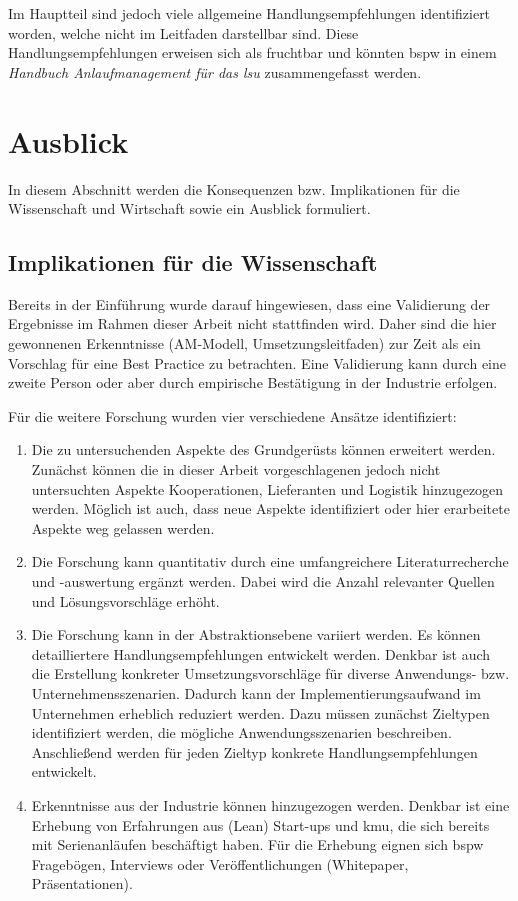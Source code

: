Im Hauptteil sind jedoch viele allgemeine Handlungsempfehlungen identifiziert worden, welche nicht im Leitfaden darstellbar sind. Diese Handlungsempfehlungen erweisen sich als fruchtbar und könnten \gls{bspw} in einem \textit{Handbuch Anlaufmanagement für das \gls{lsu}} zusammengefasst werden. 

\section{Ausblick}

In diesem Abschnitt werden die Konsequenzen bzw. Implikationen für die Wissenschaft und Wirtschaft sowie ein Ausblick formuliert. 

\subsection*{Implikationen für die Wissenschaft}
Bereits in der Einführung wurde darauf hingewiesen, dass eine Validierung der Ergebnisse im Rahmen dieser Arbeit nicht stattfinden wird. Daher sind die hier gewonnenen Erkenntnisse (AM-Modell, Umsetzungsleitfaden) zur Zeit als ein Vorschlag für eine Best Practice zu betrachten. Eine Validierung kann durch eine zweite Person %
oder aber durch empirische Bestätigung in der Industrie erfolgen. 

Für die weitere Forschung wurden vier verschiedene Ansätze identifiziert: 

\begin{enumerate}
 \item Die zu untersuchenden Aspekte des Grundgerüsts können erweitert werden. Zunächst können die in dieser Arbeit vorgeschlagenen jedoch nicht untersuchten Aspekte Kooperationen, Lieferanten und Logistik 
 hinzugezogen werden. Möglich ist auch, dass neue Aspekte identifiziert oder hier erarbeitete Aspekte weg gelassen werden.  
\item Die Forschung kann quantitativ durch eine umfangreichere Literaturrecherche und -aus\-wer\-tung ergänzt werden. Dabei wird die Anzahl relevanter Quellen und Lösungsvorschläge erhöht. 
\item Die Forschung kann in der Abstraktionsebene variiert werden. Es können detailliertere Handlungsempfehlungen entwickelt werden. Denkbar ist auch die Erstellung konkreter Umsetzungsvorschläge für diverse Anwendungs- bzw. Unternehmensszenarien. Dadurch kann der Implementierungsaufwand im Unternehmen erheblich reduziert werden. Dazu müssen zunächst Zieltypen identifiziert werden, die mögliche Anwendungsszenarien beschreiben. Anschließend werden für jeden Zieltyp konkrete Handlungsempfehlungen entwickelt. 
\item Erkenntnisse aus der Industrie können hinzugezogen werden. Denkbar ist eine Erhebung von Erfahrungen aus (Lean) Start-ups und \gls{kmu}, die sich bereits mit Serienanläufen beschäftigt haben. Für die Erhebung eignen sich \gls{bspw} Fragebögen, Interviews oder Veröffentlichungen (Whitepaper, Präsentationen). 
\end{enumerate}



